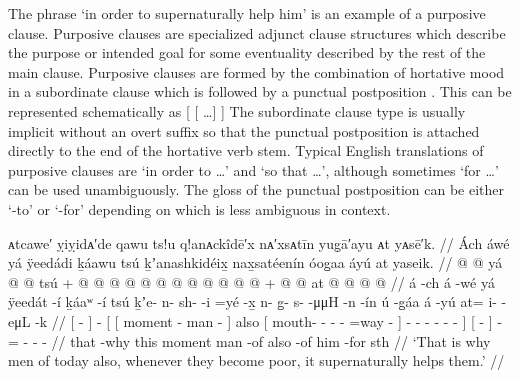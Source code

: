 The phrase  ‘in order to supernaturally help him’ is an example of a purposive clause.
Purposive clauses are specialized adjunct clause structures which describe the purpose or intended goal for some eventuality described by the rest of the main clause.
Purposive clauses are formed by the combination of hortative mood in a subordinate clause which is followed by a punctual postposition  \parencites[91–92]{naish:1966}[106, 187]{story:1966}[427–428]{leer:1991}.
This can be represented schematically as [ [ …] ] The subordinate clause type is usually implicit without an overt  suffix so that the punctual postposition is attached directly to the end of the hortative verb stem.
Typical English translations of purposive clauses are ‘in order to …’ and ‘so that …’, although sometimes ‘for …’ can be used unambiguously.
The gloss of the punctual postposition can be either ‘-to’ or ‘-for’ depending on which is less ambiguous in context.

\ex\label{ex:89-200-men-today-become-poor-super-help}%
%
\begingl
	\glpreamble	ᴀtcawe′ ỵiỵidᴀ′de qawu ts!u q!anᴀckîdē′x nᴀ′xsᴀtīn yug̣ā′ayu ᴀt yᴀsē′k. //
	\glpreamble	Ách áwé yá ÿeedádi ḵáawu tsú ḵʼanashkidéix̱ nax̱satéenín óog̱aa áyú at yaseik. //
	\gla	{}  @ {} {}  @ {}
		{} {} yá  @ {}  @ {} {} tsú +
			{}  @ {} @ {} @ {} @ {} @ {} @ {} {}
			 @ {} @ {} @ {} @ {} @ {} @ {} {} +
		{}  @ {} {}  @ {}
		at @  @ {} @ {} @ {} //
	\glb	{} á -ch {} á -wé
		{} {} yá ÿeedát -í ḵáaʷ -í {} tsú
			{} ḵʼe- n- sh-  -i =yé -x̱ {}
			n- g̱- s-  -μμH -n -ín {}
		{} ú -g̱áa {} á -yú
		at= i-  -eμL -k //
	\glc	{}[  - {}]  -
		{}[ {}[  moment - man - {}] also
			{}[ mouth- - -  - =way - {}]
			- - -  - - - {}]
		{}[  - {}]  -
		= -  - - //
	\gld	{} that -why {}  {}
		{} {} this moment {} man -of {} also
			{}  {} {} {} {} {} -of {}
			 {} {} {} {} {} {} {}
			{} him -for {}  {}
			sth\•  {} {} {} //
	\glft	‘That is why men of today also, whenever they become poor, it supernaturally helps them.’
		//
\endgl
\xe

